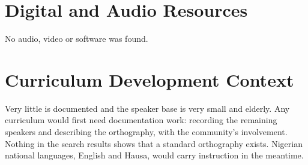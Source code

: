 \documentclass[12pt]{article}
\begin{document}
\section{Digital and Audio Resources}
No audio, video or software was found.

\section{Curriculum Development Context}
Very little is documented and the speaker base is very small and elderly. Any curriculum would first need documentation work: recording the remaining speakers and describing the orthography, with the community's involvement. Nothing in the search results shows that a standard orthography exists. Nigerian national languages, English and Hausa, would carry instruction in the meantime.
\end{document}
